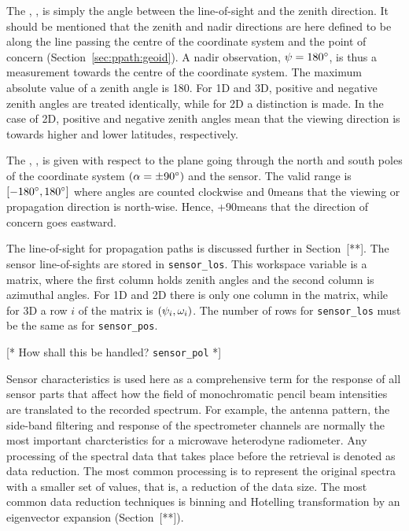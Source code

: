 The , \ZntAng, is simply the angle between the
line-of-sight and the zenith direction. It should be mentioned that
the zenith and nadir directions are here defined to be along the line
passing the centre of the coordinate system and the point of concern
(Section~\ref{sec:ppath:geoid}). A nadir observation,
$\psi=180^\circ$, is thus a measurement towards the centre of the
coordinate system. The maximum absolute value of a zenith angle is
180\degree. For 1D and 3D, positive and negative zenith angles are
treated identically, while for 2D a distinction is made. In the case
of 2D, positive and negative zenith angles mean that the viewing
direction is towards higher and lower latitudes, respectively.

The , \AzmAng, is given with respect to the
plane going through the north and south poles of the coordinate system
$(\alpha=\pm90^\circ)$ and the sensor. The valid range is
$[-180^\circ,180^\circ]$ where angles are counted clockwise and
0\degree means that the viewing or propagation direction is north-wise.
Hence, +90\degree means that the direction of concern goes eastward.

The line-of-sight for propagation paths is discussed further in
Section~[**]. The sensor line-of-sights are stored in
\verb|sensor_los|. This workspace variable is a matrix, where the
first column holds zenith angles and the second column is azimuthal
angles. For 1D and 2D there is only one column in the matrix, while
for 3D a row $i$ of the matrix is $(\psi_{i},\omega_{i})$. The
number of rows for \verb|sensor_los| must be the same as for
\verb|sensor_pos|.


\label{sec:fm_defs:sensorpol}

[* How shall this be handled? \verb|sensor_pol| *]


\label{sec:fm_defs:sensorchar}

Sensor characteristics is used here as a comprehensive term for the
response of all sensor parts that affect how the field of
monochromatic pencil beam intensities are translated to the recorded
spectrum. For example, the antenna pattern, the side-band filtering
and response of the spectrometer channels are normally the most
important charcteristics for a microwave heterodyne radiometer. Any
processing of the spectral data that takes place before the retrieval
is denoted as data reduction. The most common processing is to
represent the original spectra with a smaller set of values, that is,
a reduction of the data size. The most common data reduction
techniques is binning and Hotelling transformation by an eigenvector
expansion (Section~[**]).

